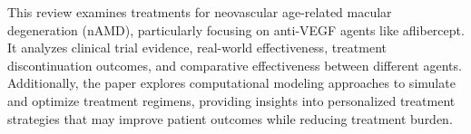 
This review examines treatments for neovascular age-related macular degeneration (nAMD), particularly focusing on anti-VEGF agents like aflibercept. It analyzes clinical trial evidence, real-world effectiveness, treatment discontinuation outcomes, and comparative effectiveness between different agents. Additionally, the paper explores computational modeling approaches to simulate and optimize treatment regimens, providing insights into personalized treatment strategies that may improve patient outcomes while reducing treatment burden.
